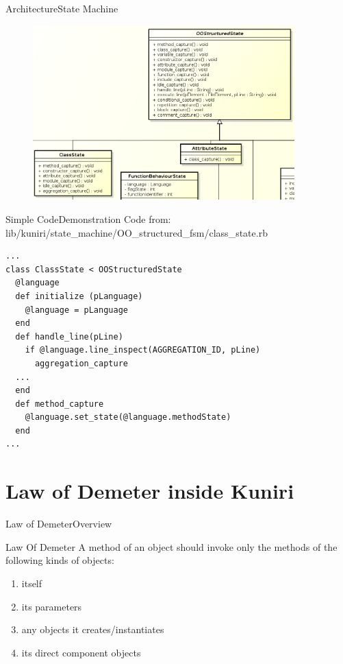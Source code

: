 \documentclass[10pt]{beamer}
\begin{document}
\begin{frame}{Architecture}{State Machine}
  \begin{figure}[Look at class structure]
    \includegraphics[width=0.9\textwidth]{images/classFSM.png}
  \end{figure}
\end{frame}

\begin{frame}[fragile]{Simple Code}{Demonstration}
Code from: lib/kuniri/state\_machine/OO\_structured\_fsm/class\_state.rb
\small
\begin{lstlisting}
...
class ClassState < OOStructuredState
  @language
  def initialize (pLanguage)
    @language = pLanguage
  end
  def handle_line(pLine)
    if @language.line_inspect(AGGREGATION_ID, pLine)
      aggregation_capture
  ...
  end
  def method_capture
    @language.set_state(@language.methodState)
  end
...
\end{lstlisting}
\end{frame}


\section{Law of Demeter inside Kuniri}
\begin{frame}{Law of Demeter}{Overview}
\begin{block}{Law Of Demeter}
A method of an object should invoke only the methods of the following kinds of
objects:
  \begin{enumerate}
    \item itself
    \item its parameters
    \item any objects it creates/instantiates
    \item its direct component objects
  \end{enumerate}
\end{block}
\end{frame}
\end{document}

